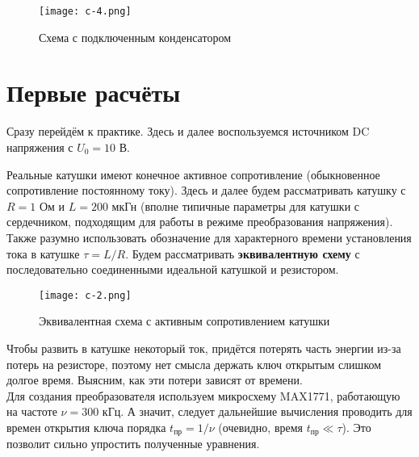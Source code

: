 \documentclass{letask}
\begin{document}
\begin{figure}[h!]
\centering
\texttt{[image: c-4.png]}
\caption{Схема с подключенным конденсатором}
\end{figure}





\section*{Первые расчёты}
Сразу перейдём к практике. Здесь и далее воспользуемся источником DC напряжения с $U_0 = 10$ В.

Реальные катушки имеют конечное активное сопротивление (обыкновенное сопротивление постоянному току). Здесь и далее будем рассматривать катушку с $R = 1$ Ом и $L = 200$ мкГн (вполне типичные параметры для катушки с сердечником, подходящим для работы в режиме преобразования напряжения). Также разумно использовать обозначение для характерного времени установления тока в катушке $\tau = L/R$. Будем рассматривать \textbf{эквивалентную схему} с последовательно соединенными идеальной катушкой и резистором.\\

\begin{figure}[h!]
\centering
\texttt{[image: c-2.png]}
\caption{Эквивалентная схема с активным сопротивлением катушки}
\end{figure}


Чтобы развить в катушке некоторый ток, придётся потерять часть энергии из-за потерь на резисторе, поэтому нет смысла держать ключ открытым слишком долгое время. Выясним, как эти потери зависят от времени.\\

Для создания преобразователя используем микросхему MAX1771, работающую на частоте $\nu = 300$ кГц. А значит, следует дальнейшие вычисления проводить для времен открытия ключа порядка $t_\text{пр} = 1/\nu$ (очевидно, время $t_\text{пр} \ll \tau$). Это позволит сильно упростить полученные уравнения.\\
\end{document}
